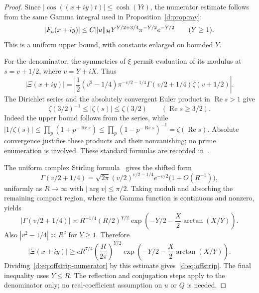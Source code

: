 \documentclass[11pt,a4paper]{article}
\numberwithin{equation}{section}
\theoremstyle{definition}\newtheorem{definition}[theorem]{Definition}
\theoremstyle{remark}\newtheorem{remark}[theorem]{Remark}
\newcommand{\Hh}{\mathcal H}\newcommand{\Hw}{\mathcal H}
\begin{document}
\begin{proof}
Since $|\cos((x+iy)t)|\le\cosh(Yt)$, the numerator estimate follows from the same Gamma integral used in Proposition~\ref{d:prop:ray}:
\begin{equation}\label{d:eq:offstrip-numerator}
 |F_u(x+iy)|\le C\norm{u}_{\Hh}
 Y^{Y/2+3/4}\pi^{-Y/2}e^{-Y/2}\qquad(Y\ge1).
\end{equation}
This is a uniform upper bound, with constants enlarged on bounded $Y$.

For the denominator, the symmetries of $\xi$ permit evaluation of its modulus at $s=v+1/2$, where $v=Y+iX$. Thus
\[
 |\Xi(x+iy)|
 =\left|\frac12(v^2-1/4)\pi^{-v/2-1/4}
       \Gamma(v/2+1/4)\zeta(v+1/2)\right|.
\]
The Dirichlet series and the absolutely convergent Euler product in $\operatorname{Re}s>1$ give
\begin{equation}\label{d:eq:zeta-uniform}
 \zeta(3/2)^{-1}\le|\zeta(s)|\le\zeta(3/2)
 \qquad(\operatorname{Re}s\ge3/2).
\end{equation}
Indeed the upper bound follows from the series, while
$|1/\zeta(s)|\le\prod_p(1+p^{-\operatorname{Re}s})
 \le\prod_p(1-p^{-\operatorname{Re}s})^{-1}
 =\zeta(\operatorname{Re}s)$.
Absolute convergence justifies these products and their nonvanishing; no prime enumeration is involved. These standard formulas are recorded in~\cite[Eq.~25.2.11]{DLMF}.

The uniform complex Stirling formula~\cite[\S5.11]{DLMF} gives the shifted form
\[
 \Gamma(v/2+1/4)
 =\sqrt{2\pi}(v/2)^{v/2-1/4}e^{-v/2}
       \bigl(1+O(R^{-1})\bigr),
\]
uniformly as $R\to\infty$ with $|\arg v|\le\pi/2$. Taking moduli and absorbing the remaining compact region, where the Gamma function is continuous and nonzero, yields
\[
 |\Gamma(v/2+1/4)|\asymp
 R^{-1/4}(R/2)^{Y/2}
 \exp\left(-Y/2-\frac X2\arctan(X/Y)\right).
\]
Also $|v^2-1/4|\asymp R^2$ for $Y\ge1$. Therefore
\begin{equation}\label{d:eq:offstrip-denominator}
 |\Xi(x+iy)|\ge c R^{7/4}
 \left(\frac R{2\pi}\right)^{Y/2}
 \exp\left(-Y/2-\frac X2\arctan(X/Y)\right).
\end{equation}
Dividing~\eqref{d:eq:offstrip-numerator} by this estimate gives~\eqref{d:eq:offstrip}. The final inequality uses $Y\le R$. The reflection and conjugation steps apply to the denominator only; no real-coefficient assumption on $u$ or $Q$ is needed.
\end{proof}
\end{document}
